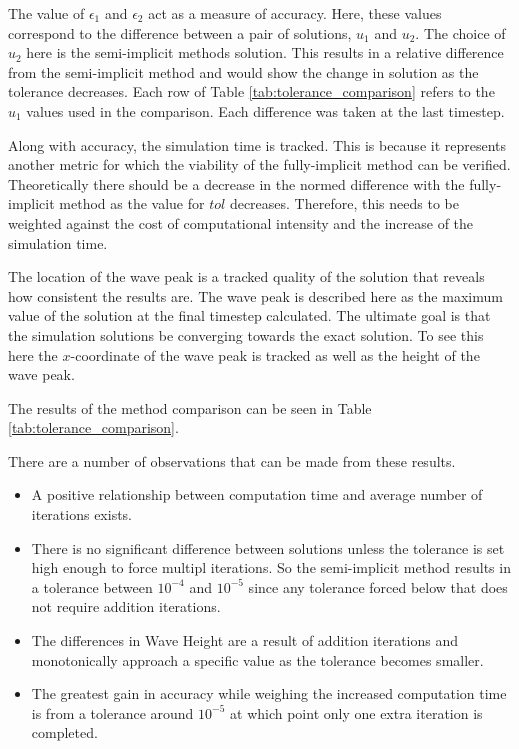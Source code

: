   The value of $\epsilon_1$ and $\epsilon_2$ act as a measure of accuracy.
  Here, these values correspond to the difference between a pair of solutions, $u_1$ and $u_2$.
  The choice of $u_2$ here is the semi-implicit methods solution.
  This results in a relative difference from the semi-implicit method and would show the change in solution as the tolerance decreases.
  Each row of Table \ref{tab:tolerance_comparison} refers to the $u_1$ values used in the comparison.
  Each difference was taken at the last timestep.

  Along with accuracy, the simulation time is tracked.
  This is because it represents another metric for which the viability of the fully-implicit method can be verified.
  Theoretically there should be a decrease in the normed difference with the fully-implicit method as the value for $tol$ decreases.
  Therefore, this needs to be weighted against the cost of computational intensity and the increase of the simulation time.

  The location of the wave peak is a tracked quality of the solution that reveals how consistent the results are.
  The wave peak is described here as the maximum value of the solution at the final timestep calculated.
  The ultimate goal is that the simulation solutions be converging towards the exact solution.
  To see this here the $x$-coordinate of the wave peak is tracked as well as the height of the wave peak.

  The results of the method comparison can be seen in Table \ref{tab:tolerance_comparison}.

  

  There are a number of observations that can be made from these results.
  \begin{itemize}
    \item A positive relationship between computation time and average number of iterations exists.
    \item There is no significant difference between solutions unless the tolerance is set high enough to force multipl iterations. 
          So the semi-implicit method results in a tolerance between $10^{-4}$ and $10^{-5}$ since any tolerance forced below that does not require addition iterations.
    \item The differences in Wave Height are a result of addition iterations and monotonically approach a specific value as the tolerance becomes smaller.
    \item The greatest gain in accuracy while weighing the increased computation time is from a tolerance around $10^{-5}$ at which point only one extra iteration is completed.
  \end{itemize}
  
